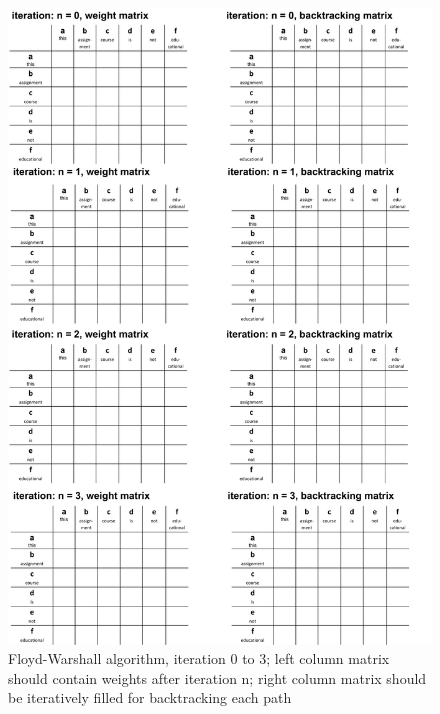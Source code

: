 \documentclass{article}
\begin{document}
\begin{figure}[!h]
        \centering
        \includegraphics[width=1.0\textwidth]{./figures/wfst_charts_1.pdf}
        \caption{Floyd-Warshall algorithm, iteration 0 to 3; left column matrix should contain weights after iteration n; right column matrix should be iteratively filled for backtracking each path}
        \label{fig:wfst_charts_1}
    \end{figure} 
    
\end{document}
